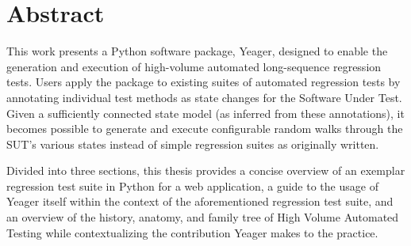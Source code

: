\doublespacing
\chapter*{Abstract}
\abstract{}
 This work presents a Python software package, Yeager, designed to enable the generation and execution of high-volume automated long-sequence regression tests. Users apply the package to existing suites of automated regression tests by annotating individual test methods as state changes for the Software Under Test. Given a sufficiently connected state model (as inferred from these annotations), it becomes possible to generate and execute configurable random walks through the SUT's various states instead of simple regression suites as originally written.

Divided into three sections, this thesis provides a concise overview of an exemplar regression test suite in Python for a web application, a guide to the usage of Yeager itself within the context of the aforementioned regression test suite, and an overview of the history, anatomy, and family tree of High Volume Automated Testing while contextualizing the contribution Yeager makes to the practice.
